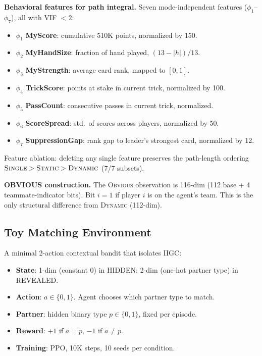 \documentclass[letterpaper]{article}
\begin{document}
\medskip
\noindent\textbf{Behavioral features for path integral.}
Seven mode-independent features ($\phi_1$--$\phi_7$), all with VIF $< 2$:
\begin{itemize}
\item $\phi_1$ \textbf{MyScore}: cumulative 510K points, normalized by 150.
\item $\phi_2$ \textbf{MyHandSize}: fraction of hand played, $(13 - |h|)/13$.
\item $\phi_3$ \textbf{MyStrength}: average card rank, mapped to $[0,1]$.
\item $\phi_4$ \textbf{TrickScore}: points at stake in current trick, normalized by 100.
\item $\phi_5$ \textbf{PassCount}: consecutive passes in current trick, normalized.
\item $\phi_6$ \textbf{ScoreSpread}: std.\ of scores across players, normalized by 50.
\item $\phi_7$ \textbf{SuppressionGap}: rank gap to leader's strongest card, normalized by 12.
\end{itemize}
Feature ablation: deleting any single feature preserves the path-length ordering
$\textsc{Single} > \textsc{Static} > \textsc{Dynamic}$ (7/7 subsets).

\medskip
\noindent\textbf{OBVIOUS construction.}
The \textsc{Obvious} observation is 116-dim (112 base + 4 teammate-indicator bits).
Bit $i=1$ if player $i$ is on the agent's team. This is the only structural
difference from \textsc{Dynamic} (112-dim).

\subsection{Toy Matching Environment}

A minimal 2-action contextual bandit that isolates IIGC:

\begin{itemize}
\item \textbf{State}: 1-dim (constant 0) in HIDDEN; 2-dim (one-hot partner type) in REVEALED.
\item \textbf{Action}: $a \in \{0, 1\}$. Agent chooses which partner type to match.
\item \textbf{Partner}: hidden binary type $p \in \{0, 1\}$, fixed per episode.
\item \textbf{Reward}: $+1$ if $a = p$, $-1$ if $a \neq p$.
\item \textbf{Training}: PPO, 10K steps, 10 seeds per condition.
\end{itemize}
\end{document}
